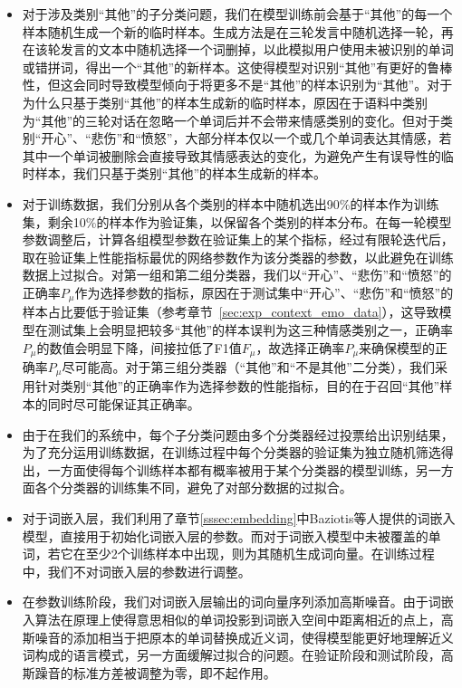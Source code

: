 \begin{itemize}

\item 对于涉及类别“其他”的子分类问题，我们在模型训练前会基于“其他”的每一个样本随机生成一个新的临时样本。生成方法是在三轮发言中随机选择一轮，再在该轮发言的文本中随机选择一个词删掉，以此模拟用户使用未被识别的单词或错拼词，得出一个“其他”的新样本。这使得模型对识别“其他”有更好的鲁棒性，但这会同时导致模型倾向于将更多不是“其他”的样本识别为“其他”。对于为什么只基于类别“其他”的样本生成新的临时样本，原因在于语料中类别为“其他”的三轮对话在忽略一个单词后并不会带来情感类别的变化。但对于类别“开心”、“悲伤”和“愤怒”，大部分样本仅以一个或几个单词表达其情感，若其中一个单词被删除会直接导致其情感表达的变化，为避免产生有误导性的临时样本，我们只基于类别“其他”的样本生成新的样本。

\item 对于训练数据，我们分别从各个类别的样本中随机选出90\%的样本作为训练集，剩余10\%的样本作为验证集，以保留各个类别的样本分布。在每一轮模型参数调整后，计算各组模型参数在验证集上的某个指标，经过有限轮迭代后，取在验证集上性能指标最优的网络参数作为该分类器的参数，以此避免在训练数据上过拟合。对第一组和第二组分类器，我们以“开心”、“悲伤”和“愤怒”的正确率$P_\mu$作为选择参数的指标，原因在于测试集中“开心”、“悲伤”和“愤怒”的样本占比要低于验证集（参考章节~\ref{sec:exp_context_emo_data}），这导致模型在测试集上会明显把较多“其他”的样本误判为这三种情感类别之一，正确率$P_\mu$的数值会明显下降，间接拉低了F1值$F_\mu$，故选择正确率$P_\mu$来确保模型的正确率$P_\mu$尽可能高。对于第三组分类器（“其他”和“不是其他”二分类），我们采用针对类别“其他”的正确率作为选择参数的性能指标，目的在于召回“其他”样本的同时尽可能保证其正确率。

\item 由于在我们的系统中，每个子分类问题由多个分类器经过投票给出识别结果，为了充分运用训练数据，在训练过程中每个分类器的验证集为独立随机筛选得出，一方面使得每个训练样本都有概率被用于某个分类器的模型训练，另一方面各个分类器的训练集不同，避免了对部分数据的过拟合。

\item 对于词嵌入层，我们利用了章节\ref{sssec:embedding}中Baziotis等人\cite{baziotis2018ntua}提供的词嵌入模型，直接用于初始化词嵌入层的参数。而对于词嵌入模型中未被覆盖的单词，若它在至少2个训练样本中出现，则为其随机生成词向量。在训练过程中，我们不对词嵌入层的参数进行调整。

\item 在参数训练阶段，我们对词嵌入层输出的词向量序列添加高斯噪音。由于词嵌入算法在原理上使得意思相似的单词投影到词嵌入空间中距离相近的点上，高斯噪音的添加相当于把原本的单词替换成近义词，使得模型能更好地理解近义词构成的语言模式，另一方面缓解过拟合的问题。在验证阶段和测试阶段，高斯躁音的标准方差被调整为零，即不起作用。


\end{itemize}
